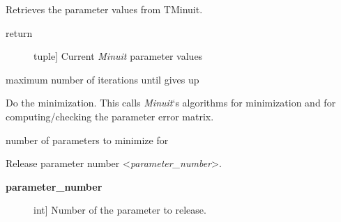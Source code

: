 \documentclass[a4paper,10pt,english]{sphinxmanual}
\begin{document}
\begin{fulllineitems}
\begin{fulllineitems}
\begin{description}
\end{description}

\end{fulllineitems}


\begin{fulllineitems}
\label{index:kafe.minuit.Minuit.get_parameter_values}
Retrieves the parameter values from TMinuit.
\begin{description}
\item[{return}] \leavevmode{[}tuple{]}
Current \emph{Minuit} parameter values

\end{description}

\end{fulllineitems}


\begin{fulllineitems}
\label{index:kafe.minuit.Minuit.max_iterations}
maximum number of iterations until  gives up

\end{fulllineitems}


\begin{fulllineitems}
\label{index:kafe.minuit.Minuit.minimize}
Do the minimization. This calls \emph{Minuit}`s algorithms  for
minimization and  for computing/checking the parameter error
matrix.

\end{fulllineitems}


\begin{fulllineitems}
\label{index:kafe.minuit.Minuit.number_of_parameters}
number of parameters to minimize for

\end{fulllineitems}


\begin{fulllineitems}
\label{index:kafe.minuit.Minuit.release_parameter}
Release parameter number \textless{}\emph{parameter\_number}\textgreater{}.
\begin{description}
\item[{\textbf{parameter\_number}}] \leavevmode{[}int{]}
Number of the parameter to release.


\end{description}
\end{fulllineitems}
\end{fulllineitems}
\end{document}
